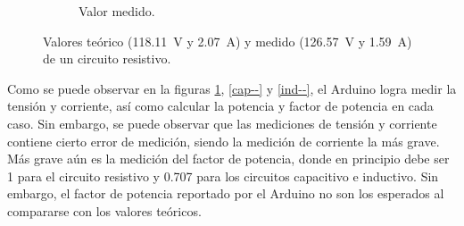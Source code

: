 \begin{figure}[h]
\begin{subfigure}{0.45\textwidth}
        \caption{Valor medido.}
    \end{subfigure}
    \caption{Valores teórico (\SI{118.11}{\volt} y \SI{2.07}{\ampere}) y medido (\SI{126.57}{\volt}
    y \SI{1.59}{\ampere}) de un circuito resistivo.}
    \label{res--}
\end{figure}

\FloatBarrier

Como se puede observar en la figuras \ref{res--}, \ref{cap--} y \ref{ind--}, el Arduino logra medir la tensión y corriente, así como calcular la potencia y factor de potencia en cada caso. Sin embargo, se puede observar que las mediciones de tensión y corriente contiene cierto error de medición, siendo la medición de corriente la más grave. Más grave aún es la medición del factor de potencia, donde en principio debe ser 1 para el circuito resistivo y 0.707 para los circuitos capacitivo e inductivo. Sin embargo, el factor de potencia reportado por el Arduino no son los esperados al compararse con los valores teóricos.

